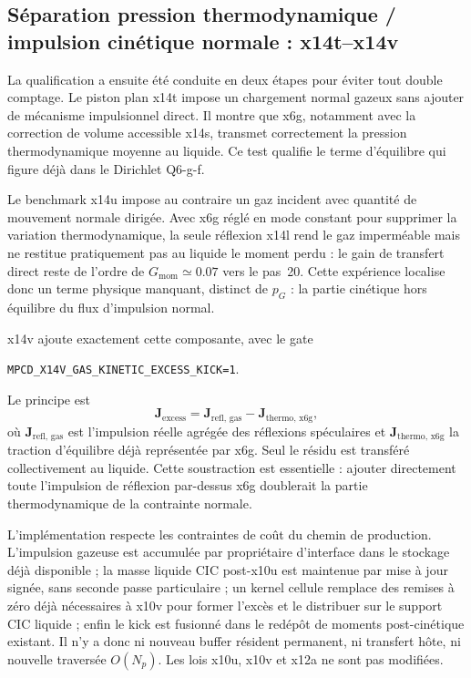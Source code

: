 \documentclass[11pt,a4paper]{article}
\begin{document}
\subsection{Séparation pression thermodynamique / impulsion cinétique normale : x14t--x14v}

La qualification a ensuite été conduite en deux étapes pour éviter tout double comptage. Le piston plan x14t impose un chargement normal gazeux sans ajouter de mécanisme impulsionnel direct. Il montre que x6g, notamment avec la correction de volume accessible x14s, transmet correctement la pression thermodynamique moyenne au liquide. Ce test qualifie le terme d'équilibre qui figure déjà dans le Dirichlet Q6-g-f.

Le benchmark x14u impose au contraire un gaz incident avec quantité de mouvement normale dirigée. Avec x6g réglé en mode constant pour supprimer la variation thermodynamique, la seule réflexion x14l rend le gaz imperméable mais ne restitue pratiquement pas au liquide le moment perdu : le gain de transfert direct reste de l'ordre de $G_{\mathrm{mom}}\simeq0.07$ vers le pas~20. Cette expérience localise donc un terme physique manquant, distinct de $p_G$ : la partie cinétique hors équilibre du flux d'impulsion normal.

x14v ajoute exactement cette composante, avec le gate
\begin{center}
\small
\nolinkurl{MPCD_X14V_GAS_KINETIC_EXCESS_KICK=1}.
\end{center}
Le principe est
\begin{equation}
  \mathbf J_{\mathrm{excess}}
  =
  \mathbf J_{\mathrm{refl,\,gas}}
  -
  \mathbf J_{\mathrm{thermo,\,x6g}},
  \label{eq:x14v-excess}
\end{equation}
où $\mathbf J_{\mathrm{refl,\,gas}}$ est l'impulsion réelle agrégée des réflexions spéculaires et $\mathbf J_{\mathrm{thermo,\,x6g}}$ la traction d'équilibre déjà représentée par x6g. Seul le résidu est transféré collectivement au liquide. Cette soustraction est essentielle : ajouter directement toute l'impulsion de réflexion par-dessus x6g doublerait la partie thermodynamique de la contrainte normale.

L'implémentation respecte les contraintes de coût du chemin de production. L'impulsion gazeuse est accumulée par propriétaire d'interface dans le stockage déjà disponible ; la masse liquide CIC post-x10u est maintenue par mise à jour signée, sans seconde passe particulaire ; un kernel cellule remplace des remises à zéro déjà nécessaires à x10v pour former l'excès et le distribuer sur le support CIC liquide ; enfin le kick est fusionné dans le redépôt de moments post-cinétique existant. Il n'y a donc ni nouveau buffer résident permanent, ni transfert hôte, ni nouvelle traversée $O(N_p)$. Les lois x10u, x10v et x12a ne sont pas modifiées.
\end{document}
